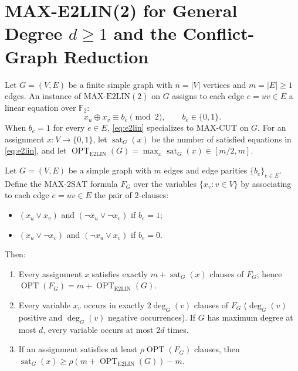 \documentclass[preprints,article,accept,oneauthor,pdftex]{Definitions/mdpi}
\begin{document}
\section{MAX-E2LIN(2) for General Degree $d \ge 1$ and the Conflict-Graph Reduction}

Let $G=(V,E)$ be a finite simple graph with $n=|V|$ vertices and $m=|E| \ge 1$ edges. An instance of $\mathrm{MAX\text{-}E2LIN}(2)$ on $G$ assigns to each edge $e=uv\in E$ a linear equation over $\mathbb{F}_2$:
\begin{equation}\label{eq:e2lin}
x_u \oplus x_v \equiv b_e \pmod{2}, \qquad b_e \in \{0,1\}.
\end{equation}
When $b_e = 1$ for every $e \in E$, \eqref{eq:e2lin} specializes to $\mathrm{MAX\text{-}CUT}$ on $G$. For an assignment $x : V \to \{0,1\}$, let $\operatorname{sat}_G(x)$ be the number of satisfied equations in \eqref{eq:e2lin}, and let $\operatorname{OPT}_{\mathrm{E2LIN}}(G) = \max_x \operatorname{sat}_G(x) \in [m/2, m]$.

\begin{Proposition}\label{prop:e2lin2sat}
Let $G=(V,E)$ be a simple graph with $m$ edges and edge parities $\{b_e\}_{e\in E}$. Define the $\mathrm{MAX\text{-}2SAT}$ formula $F_G$ over the variables $\{x_v : v\in V\}$ by associating to each edge $e=uv\in E$ the pair of $2$-clauses:
\begin{itemize}
\item $(x_u \lor x_v)$ and $(\lnot x_u \lor \lnot x_v)$ if $b_e = 1$;
\item $(x_u \lor \lnot x_v)$ and $(\lnot x_u \lor x_v)$ if $b_e = 0$.
\end{itemize}
Then:
\begin{enumerate}
\item Every assignment $x$ satisfies exactly $m + \operatorname{sat}_G(x)$ clauses of $F_G$; hence $\operatorname{OPT}(F_G) = m + \operatorname{OPT}_{\mathrm{E2LIN}}(G)$.
\item Every variable $x_v$ occurs in exactly $2\deg_G(v)$ clauses of $F_G$ ($\deg_G(v)$ positive and $\deg_G(v)$ negative occurrences). If $G$ has maximum degree at most $d$, every variable occurs at most $2d$ times.
\item If an assignment satisfies at least $\rho \operatorname{OPT}(F_G)$ clauses, then $\operatorname{sat}_G(x) \ge \rho(m + \operatorname{OPT}_{\mathrm{E2LIN}}(G)) - m$.
\end{enumerate}
\end{Proposition}
\end{document}
